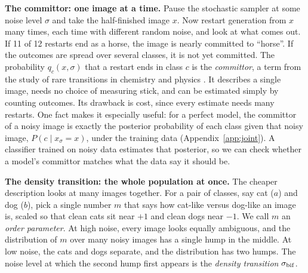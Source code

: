 \documentclass[11pt]{article}
\newcommand{\para}[1]{\textbf{#1}\hspace{0.6em}}
\newcommand{\sbif}{\sigma_{\rm bif}}
\begin{document}
\para{The committor: one image at a time.}
Pause the stochastic sampler at some noise level $\sigma$ and take the half-finished image $x$. Now restart generation from $x$ many times, each time with different random noise, and look at what comes out. If 11 of 12 restarts end as a horse, the image is nearly committed to ``horse''. If the outcomes are spread over several classes, it is not yet committed. The probability $q_c(x,\sigma)$ that a restart ends in class $c$ is the \emph{committor}, a term from the study of rare transitions in chemistry and physics \citep{e2010transition}. It describes a single image, needs no choice of measuring stick, and can be estimated simply by counting outcomes. Its drawback is cost, since every estimate needs many restarts. One fact makes it especially useful: for a perfect model, the committor of a noisy image is exactly the posterior probability of each class given that noisy image, $P(c\mid x_\sigma=x)$, under the training data (Appendix~\ref{app:joint}). A classifier trained on noisy data estimates that posterior, so we can check whether a model's committor matches what the data say it should be.

\para{The density transition: the whole population at once.}
The cheaper description looks at many images together. For a pair of classes, say cat ($a$) and dog ($b$), pick a single number $m$ that says how cat-like versus dog-like an image is, scaled so that clean cats sit near $+1$ and clean dogs near $-1$. We call $m$ an \emph{order parameter}. At high noise, every image looks equally ambiguous, and the distribution of $m$ over many noisy images has a single hump in the middle. At low noise, the cats and dogs separate, and the distribution has two humps. The noise level at which the second hump first appears is the \emph{density transition} $\sbif$.
\end{document}
